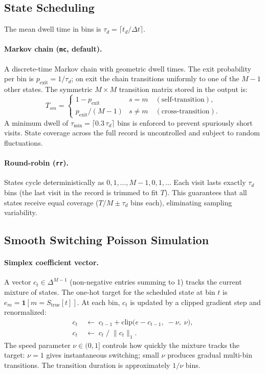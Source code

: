 \documentclass[11pt]{article}
\begin{document}
\subsection{State Scheduling}
\label{sec:scheduling}

The mean dwell time in bins is
$\tau_d = \lceil t_d / \Delta t \rceil$.

\paragraph{Markov chain (\texttt{mc}, default).}
A discrete-time Markov chain with geometric dwell times.
The exit probability per bin is $p_{\mathrm{exit}} = 1/\tau_d$;
on exit the chain transitions uniformly to one of the $M-1$ other states.
The symmetric $M \times M$ transition matrix stored in the output is:
\begin{equation}
  T_{sm} =
  \begin{cases}
    1 - p_{\mathrm{exit}} & s = m \quad (\text{self-transition}), \\
    p_{\mathrm{exit}}/(M-1) & s \neq m \quad (\text{cross-transition}).
  \end{cases}
  \label{eq:trans}
\end{equation}
A minimum dwell of
$\tau_{\min} = \lceil 0.3\,\tau_d \rceil$ bins is enforced
to prevent spuriously short visits.
State coverage across the full record is uncontrolled and subject
to random fluctuations.

\paragraph{Round-robin (\texttt{rr}).}
States cycle deterministically as $0, 1, \dots, M-1, 0, 1, \dots$
Each visit lasts exactly $\tau_d$ bins (the last visit in the
record is trimmed to fit $T$).
This guarantees that all states receive equal coverage
($T/M \pm \tau_d$ bins each), eliminating sampling variability.

\subsection{Smooth Switching Poisson Simulation}
\label{sec:switching}

\paragraph{Simplex coefficient vector.}
A vector $c_t \in \Delta^{M-1}$
(non-negative entries summing to 1) tracks the current mixture of
states.
The one-hot target for the scheduled state at bin $t$ is
$e_m = \mathbf{1}[m = S_{\text{true}}[t]]$.
At each bin, $c_t$ is updated by a clipped gradient step and
renormalized:
\begin{align}
  c_t &\;\leftarrow\; c_{t-1}
        + \mathrm{clip}\!\bigl(e - c_{t-1},\; -\nu,\; \nu\bigr), \\
  c_t &\;\leftarrow\; c_t \;/\; \|c_t\|_1.
  \label{eq:smooth_update}
\end{align}
The speed parameter $\nu \in (0,1]$ controls how quickly the mixture
tracks the target: $\nu = 1$ gives instantaneous switching;
small $\nu$ produces gradual multi-bin transitions.
The transition duration is approximately $1/\nu$ bins.
\end{document}
